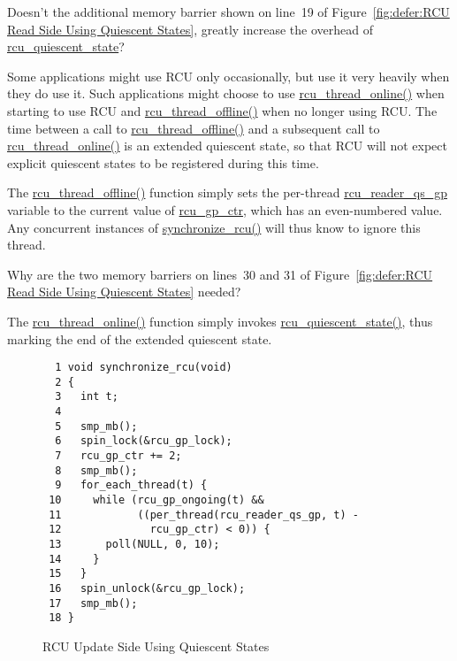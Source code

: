 \QuickQuiz{}
	Doesn't the additional memory barrier shown on line~19 of
	Figure~\ref{fig:defer:RCU Read Side Using Quiescent States},
	greatly increase the overhead of \url{rcu_quiescent_state}?
 \QuickQuizEnd

Some applications might use RCU only occasionally, but use it very heavily
when they do use it.
Such applications might choose to use \url{rcu_thread_online()} when
starting to use RCU and \url{rcu_thread_offline()} when no longer
using RCU.
The time between a call to \url{rcu_thread_offline()} and a subsequent
call to \url{rcu_thread_online()} is an extended quiescent state,
so that RCU will not expect explicit quiescent states to be registered
during this time.

The \url{rcu_thread_offline()} function simply sets the
per-thread \url{rcu_reader_qs_gp} variable to the current value of
\url{rcu_gp_ctr}, which has an even-numbered value.
Any concurrent instances of \url{synchronize_rcu()} will thus know to
ignore this thread.

\QuickQuiz{}
	Why are the two memory barriers on lines~30 and 31 of
	Figure~\ref{fig:defer:RCU Read Side Using Quiescent States}
	needed?
 \QuickQuizEnd

The \url{rcu_thread_online()} function simply invokes
\url{rcu_quiescent_state()}, thus marking the end of the extended
quiescent state.

\begin{figure}[tbp]
{ \scriptsize
\begin{verbatim}
  1 void synchronize_rcu(void)
  2 {
  3   int t;
  4 
  5   smp_mb();
  6   spin_lock(&rcu_gp_lock);
  7   rcu_gp_ctr += 2;
  8   smp_mb();
  9   for_each_thread(t) {
 10     while (rcu_gp_ongoing(t) &&
 11            ((per_thread(rcu_reader_qs_gp, t) -
 12              rcu_gp_ctr) < 0)) {
 13       poll(NULL, 0, 10);
 14     }
 15   }
 16   spin_unlock(&rcu_gp_lock);
 17   smp_mb();
 18 }
\end{verbatim}
}
\caption{RCU Update Side Using Quiescent States}
\label{fig:defer:RCU Update Side Using Quiescent States}
\end{figure}

